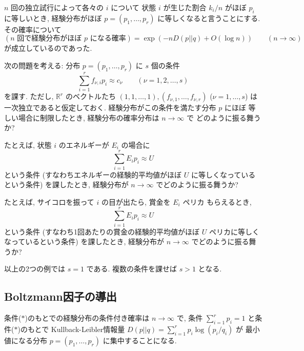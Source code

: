 \documentclass[12pt,twoside]{jarticle}
\newcommand\R{{\mathbb R}} %
\theoremstyle{jplain}
\theoremstyle{jplain}
\theoremstyle{jplain}
\numberwithin{theorem}{section}
\numberwithin{equation}{section}
\numberwithin{figure}{section}
\numberwithin{table}{section}
\begin{document}
$n$ 回の独立試行によって各々の $i$ について
状態 $i$ が生じた割合 $k_i/n$ がほぼ $p_i$ に等しいとき, 
経験分布がほぼ $p=(p_1,\ldots,p_r)$ に等しくなると言うことにする.
その確率について 
\[
(\text{$n$ 回で経験分布がほぼ $p$ になる確率})
=
\exp(-n D(p||q) + O(\log n))
\qquad (n\to\infty)
\]
が成立しているのであった. 

次の問題を考える: 分布 $p=(p_1,\ldots,p_r)$ に $s$ 個の条件
\[
\sum_{i=1}^r f_{\nu,i}p_i \approx c_\nu
\qquad (\nu=1,2,\ldots,s)
\tag{$*$}
\]
を課す. 
ただし, $\R^r$ のベクトルたち $(1,1,\ldots,1),(f_{\nu,1},\ldots,f_{\nu,r})$ 
($\nu=1,\ldots,s$) は一次独立であると仮定しておく.
経験分布がこの条件を満たす分布 $p$ にほぼ
等しい場合に制限したとき, 経験分布の確率分布は $n\to\infty$ で
どのように振る舞うか?

たとえば, 状態 $i$ のエネルギーが $E_i$ の場合に
\[
\sum_{i=1}^r E_i p_i \approx U
\]
という条件
(すなわちエネルギーの経験的平均値がほぼ $U$ に等しくなっているという条件)
を課したとき, 経験分布が $n\to\infty$ でどのように振る舞うか?

たとえば, サイコロを振って $i$ の目が出たら, 賞金を $E_i$ ペリカ
もらえるとき,
\[
\sum_{i=1}^r E_i p_i \approx U
\]
という条件
(すなわち1回あたりの賞金の経験的平均値がほぼ $U$ ペリカに等しくなっているという条件)
を課したとき, 経験分布が $n\to\infty$ でどのように振る舞うか?

以上の2つの例では $s=1$ である.  複数の条件を課せば $s>1$ となる.


\subsection{Boltzmann因子の導出}

条件($*$)のもとでの経験分布の条件付き確率は $n\to\infty$ で, 
条件 $\sum_{i=1}^r p_i=1$ と条件($*$)のもとで
Kullback-Leibler情報量 $D(p||q)=\sum_{i=1}^r p_i\log(p_i/q_i)$ が
最小値になる分布 $p=(p_1,\ldots,p_r)$ に集中することになる.
\end{document}
